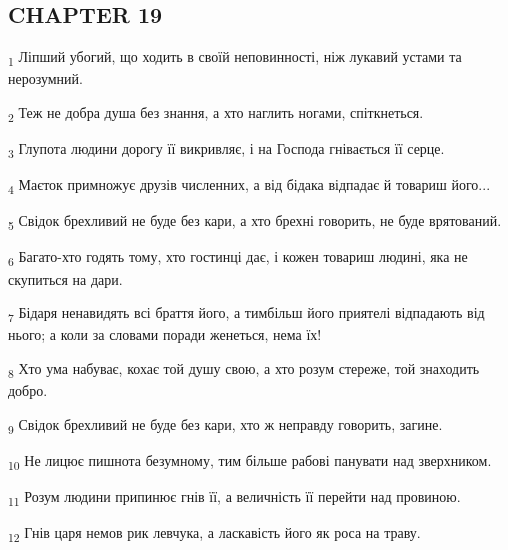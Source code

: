 \subsection{CHAPTER 19}
\begin{tcolorbox}
\textsubscript{1} Ліпший убогий, що ходить в своїй неповинності, ніж лукавий устами та нерозумний.
\end{tcolorbox}
\begin{tcolorbox}
\textsubscript{2} Теж не добра душа без знання, а хто наглить ногами, спіткнеться.
\end{tcolorbox}
\begin{tcolorbox}
\textsubscript{3} Глупота людини дорогу її викривляє, і на Господа гнівається її серце.
\end{tcolorbox}
\begin{tcolorbox}
\textsubscript{4} Маєток примножує друзів численних, а від бідака відпадає й товариш його...
\end{tcolorbox}
\begin{tcolorbox}
\textsubscript{5} Свідок брехливий не буде без кари, а хто брехні говорить, не буде врятований.
\end{tcolorbox}
\begin{tcolorbox}
\textsubscript{6} Багато-хто годять тому, хто гостинці дає, і кожен товариш людині, яка не скупиться на дари.
\end{tcolorbox}
\begin{tcolorbox}
\textsubscript{7} Бідаря ненавидять всі браття його, а тимбільш його приятелі відпадають від нього; а коли за словами поради женеться, нема їх!
\end{tcolorbox}
\begin{tcolorbox}
\textsubscript{8} Хто ума набуває, кохає той душу свою, а хто розум стереже, той знаходить добро.
\end{tcolorbox}
\begin{tcolorbox}
\textsubscript{9} Свідок брехливий не буде без кари, хто ж неправду говорить, загине.
\end{tcolorbox}
\begin{tcolorbox}
\textsubscript{10} Не лицює пишнота безумному, тим більше рабові панувати над зверхником.
\end{tcolorbox}
\begin{tcolorbox}
\textsubscript{11} Розум людини припинює гнів її, а величність її перейти над провиною.
\end{tcolorbox}
\begin{tcolorbox}
\textsubscript{12} Гнів царя немов рик левчука, а ласкавість його як роса на траву.
\end{tcolorbox}
